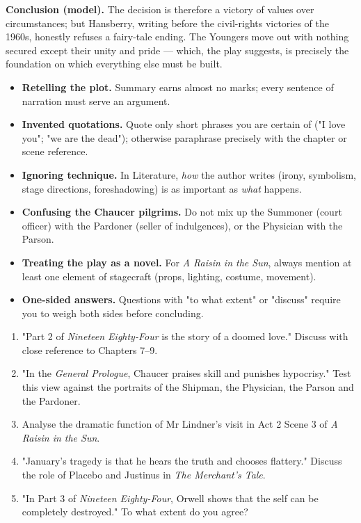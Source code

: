 \documentclass[11pt]{article}
\begin{document}
\begin{exoresolu}
\textbf{Conclusion (model).} The decision is therefore a victory of values over circumstances; but Hansberry, writing before the civil-rights victories of the 1960s, honestly refuses a fairy-tale ending. The Youngers move out with nothing secured except their unity and pride — which, the play suggests, is precisely the foundation on which everything else must be built.
\end{exoresolu}

\begin{attention}
\begin{itemize}
\item \textbf{Retelling the plot.} Summary earns almost no marks; every sentence of narration must serve an argument.
\item \textbf{Invented quotations.} Quote only short phrases you are certain of ("I love you"; "we are the dead"); otherwise paraphrase precisely with the chapter or scene reference.
\item \textbf{Ignoring technique.} In Literature, \emph{how} the author writes (irony, symbolism, stage directions, foreshadowing) is as important as \emph{what} happens.
\item \textbf{Confusing the Chaucer pilgrims.} Do not mix up the Summoner (court officer) with the Pardoner (seller of indulgences), or the Physician with the Parson.
\item \textbf{Treating the play as a novel.} For \emph{A Raisin in the Sun}, always mention at least one element of stagecraft (props, lighting, costume, movement).
\item \textbf{One-sided answers.} Questions with "to what extent" or "discuss" require you to weigh both sides before concluding.
\end{itemize}
\end{attention}

\begin{exercice}
\begin{enumerate}
\item "Part 2 of \emph{Nineteen Eighty-Four} is the story of a doomed love." Discuss with close reference to Chapters 7--9.
\item "In the \emph{General Prologue}, Chaucer praises skill and punishes hypocrisy." Test this view against the portraits of the Shipman, the Physician, the Parson and the Pardoner.
\item Analyse the dramatic function of Mr Lindner's visit in Act 2 Scene 3 of \emph{A Raisin in the Sun}.
\item "January's tragedy is that he hears the truth and chooses flattery." Discuss the role of Placebo and Justinus in \emph{The Merchant's Tale}.
\item "In Part 3 of \emph{Nineteen Eighty-Four}, Orwell shows that the self can be completely destroyed." To what extent do you agree?
\end{enumerate}
\end{exercice}
\end{document}
